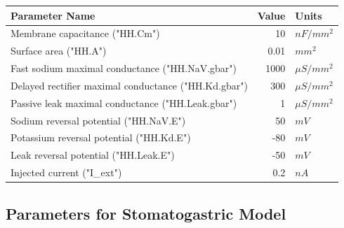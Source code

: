 \documentclass[utf8]{frontiers_suppmat} %
\begin{document}
		\begin{center}
			\begin{tabular}{|l|r|l|}
				\hline 
				\textbf{Parameter Name} & \textbf{Value} & \textbf{Units} \\ 
				\hline 
				Membrane capacitance ("HH.Cm") & 10 & ${nF}/{mm^2}$ \\ 
				\hline 
				Surface area ("HH.A") & 0.01 & $mm^2$ \\ 
				\hline 
				Fast sodium maximal conductance ("HH.NaV.gbar") & 1000 & $\mu S/mm^2$ \\ 
				\hline 
				Delayed rectifier maximal conductance ("HH.Kd.gbar") & 300 & $\mu S/mm^2$ \\ 
				\hline 
				Passive leak maximal conductance ("HH.Leak.gbar") & 1 & $\mu S/mm^2$ \\ 
				\hline 
				Sodium reversal potential ("HH.NaV.E") & 50 & $mV$ \\ 
				\hline 
				Potassium reversal potential ("HH.Kd.E") & -80 & $mV$ \\ 
				\hline
				Leak reversal potential ("HH.Leak.E") & -50 & $mV$ \\
				\hline
				Injected current ("I_ext") & 0.2 & $nA$ \\
				\hline 
			\end{tabular} 
		\end{center}
	
	\subsection{Parameters for Stomatogastric Model}
	
\end{document}
